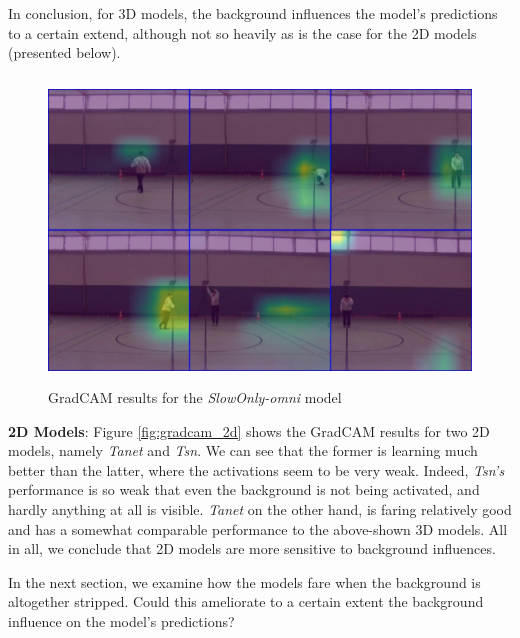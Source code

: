 \documentclass[extern,palatino]{cgMA}
\begin{document}
\noindent In conclusion, for 3D models, the background influences the model's predictions to a certain extend, although not so heavily as is the case for the 2D models (presented below).

\begin{figure}[h]
\center
\includegraphics[height={230pt}, width={370pt}]{Thesis/images/GradCAM_slow_only.jpg}
\caption{GradCAM results for the \textit{SlowOnly-omni} model}
\label{fig:GradCAM_slow_only}
\end{figure}

\bigskip
\noindent\textbf{2D Models}: Figure \ref{fig:gradcam_2d} shows the GradCAM results for two 2D models, namely \textit{Tanet} and \textit{Tsn}. We can see that the former is learning much better than the latter, where the activations seem to be very weak. Indeed, \textit{Tsn's} performance is so weak that even the background is not being activated, and hardly anything at all is visible. \textit{Tanet} on the other hand, is faring relatively good and has a somewhat comparable performance to the above-shown 3D models. All in all, we conclude that 2D models are more sensitive to background influences.

\bigskip
\noindent In the next section, we examine how the models fare when the background is altogether stripped. Could this ameliorate to a certain extent the background influence on the model's predictions?
\end{document}
